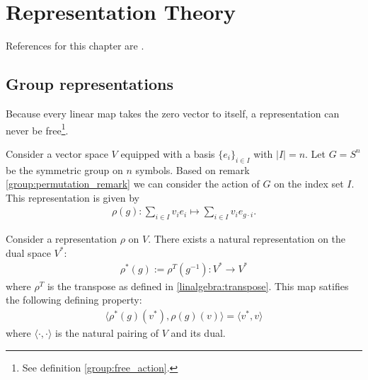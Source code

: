\chapter{Representation Theory}

    References for this chapter are \cite{fultonharris, jeevanjee}.

\section{Group representations}

    \begin{property}
        Because every linear map takes the zero vector to itself, a representation can never be free\footnote{See definition \ref{group:free_action}.}.
    \end{property}


    \begin{example}
        Consider a vector space $V$ equipped with a basis $\{e_i\}_{i\in I}$ with $|I| = n$. Let $G = S^n$ be the symmetric group on $n$ symbols. Based on remark \ref{group:permutation_remark} we can consider the action of $G$ on the index set $I$. This representation is given by
        \begin{gather}
            \rho(g):\sum_{i\in I}v_ie_i\mapsto\sum_{i\in I}v_ie_{g\cdot i}.
        \end{gather}
    \end{example}

    \begin{example}
        Consider a representation $\rho$ on $V$. There exists a natural representation on the dual space $V^*$:
        \begin{gather}
            \rho^*(g) := \rho^T(g^{-1}): V^*\rightarrow V^*
        \end{gather}
        where $\rho^T$ is the transpose as defined in \ref{linalgebra:transpose}. This map satifies the following defining property:
        \begin{gather}
            \Big\langle\rho^*(g)(v^*), \rho(g)(v)\Big\rangle = \langle v^*, v\rangle
        \end{gather}
        where $\langle\cdot,\cdot\rangle$ is the natural pairing of $V$ and its dual.
    \end{example}

